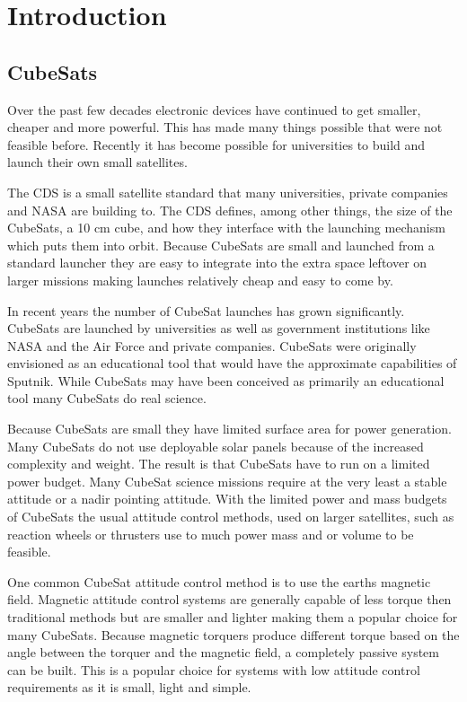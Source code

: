 

\chapter{Introduction}


\section{CubeSats}

Over the past few decades electronic devices have continued to get smaller, cheaper and more powerful. This has made many things possible that were not feasible before. Recently it has become possible for universities to build and launch their own small satellites.

The \acf{CDS} is a small satellite standard that many universities, private companies and NASA are building to. The \ac{CDS} defines, among other things, the size of the CubeSats, a 10 cm cube, and how they interface with the launching mechanism which puts them into orbit. Because CubeSats are small and launched from a standard launcher they are easy to integrate into the extra space leftover on larger missions making launches relatively cheap and easy to come by.

In recent years the number of CubeSat launches has grown significantly. CubeSats are launched by universities as well as government institutions like NASA and the Air Force and private companies. CubeSats were originally envisioned as an educational tool that would have the approximate capabilities of Sputnik. While CubeSats may have been conceived as primarily an educational tool many CubeSats do real science.

Because CubeSats are small they have limited surface area for power generation. Many CubeSats do not use deployable solar panels because of the increased complexity and weight. The result is that CubeSats have to run on a limited power budget. Many CubeSat science missions require at the very least a stable attitude or a nadir pointing attitude. With the limited power and mass budgets of CubeSats the usual attitude control methods, used on larger satellites, such as reaction wheels or thrusters use to much power mass and or volume to be feasible.

One common CubeSat attitude control method is to use the earths magnetic field. Magnetic attitude control systems are generally capable of less torque then traditional methods but are smaller and lighter making them a popular choice for many CubeSats. Because magnetic torquers produce different torque based on the angle between the torquer and the magnetic field, a completely passive system can be built. This is a popular choice for systems with low attitude control requirements as it is small, light and simple. 

